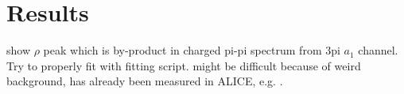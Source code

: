 \section{Results}
\label{sec:Results}


show $\rho$ peak which is by-product in charged pi-pi spectrum from 3pi $a_1$ channel. Try to properly fit with fitting script. might be difficult because of weird background, has already been measured in ALICE, e.g. \cite{ALICErho}.